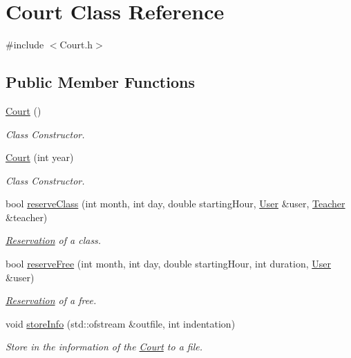 \hypertarget{class_court}{}\section{Court Class Reference}
\label{class_court}


{\ttfamily \#include $<$Court.\+h$>$}

\subsection*{Public Member Functions}
\begin{DoxyCompactItemize}
\item 
\mbox{\label{class_court_a786e4db0ebf50a5aec5bfe0cca58b06a}} 
\mbox{\hyperlink{class_court_a786e4db0ebf50a5aec5bfe0cca58b06a}{Court}} ()
\begin{DoxyCompactList}\small\item\em Class Constructor. \end{DoxyCompactList}\item 
\mbox{\hyperlink{class_court_a594463e426e762163a09290e48d1d437}{Court}} (int year)
\begin{DoxyCompactList}\small\item\em Class Constructor. \end{DoxyCompactList}\item 
bool \mbox{\hyperlink{class_court_afaab22238eff25ec1031017d57a1c008}{reserve\+Class}} (int month, int day, double starting\+Hour, \mbox{\hyperlink{class_user}{User}} \&user, \mbox{\hyperlink{class_teacher}{Teacher}} \&teacher)
\begin{DoxyCompactList}\small\item\em \mbox{\hyperlink{class_reservation}{Reservation}} of a class. \end{DoxyCompactList}\item 
bool \mbox{\hyperlink{class_court_a7391435bb499b0ba82600fef187a6fcd}{reserve\+Free}} (int month, int day, double starting\+Hour, int duration, \mbox{\hyperlink{class_user}{User}} \&user)
\begin{DoxyCompactList}\small\item\em \mbox{\hyperlink{class_reservation}{Reservation}} of a free. \end{DoxyCompactList}\item 
void \mbox{\hyperlink{class_court_a25104f6ccd6fea2d3a33798f2e30451e}{store\+Info}} (std\+::ofstream \&outfile, int indentation)
\begin{DoxyCompactList}\small\item\em Store in the information of the \mbox{\hyperlink{class_court}{Court}} to a file. \end{DoxyCompactList}\item 

\end{DoxyCompactItemize}
